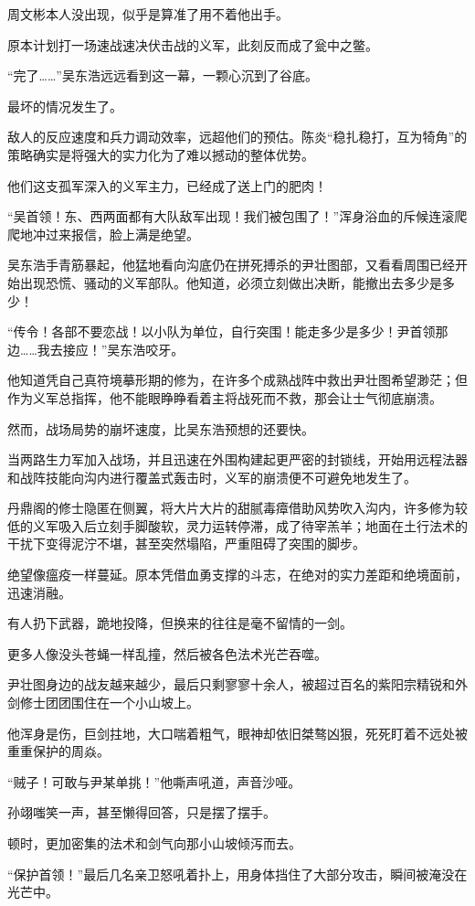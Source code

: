 周文彬本人没出现，似乎是算准了用不着他出手。

原本计划打一场速战速决伏击战的义军，此刻反而成了瓮中之鳖。

“完了……”吴东浩远远看到这一幕，一颗心沉到了谷底。

最坏的情况发生了。

敌人的反应速度和兵力调动效率，远超他们的预估。陈炎“稳扎稳打，互为犄角”的策略确实是将强大的实力化为了难以撼动的整体优势。

他们这支孤军深入的义军主力，已经成了送上门的肥肉！

“吴首领！东、西两面都有大队敌军出现！我们被包围了！”浑身浴血的斥候连滚爬爬地冲过来报信，脸上满是绝望。

吴东浩手青筋暴起，他猛地看向沟底仍在拼死搏杀的尹壮图部，又看看周围已经开始出现恐慌、骚动的义军部队。他知道，必须立刻做出决断，能撤出去多少是多少！

“传令！各部不要恋战！以小队为单位，自行突围！能走多少是多少！尹首领那边……我去接应！”吴东浩咬牙。

他知道凭自己真符境摹形期的修为，在许多个成熟战阵中救出尹壮图希望渺茫；但作为义军总指挥，他不能眼睁睁看着主将战死而不救，那会让士气彻底崩溃。

然而，战场局势的崩坏速度，比吴东浩预想的还要快。

当两路生力军加入战场，并且迅速在外围构建起更严密的封锁线，开始用远程法器和战阵技能向沟内进行覆盖式轰击时，义军的崩溃便不可避免地发生了。

丹鼎阁的修士隐匿在侧翼，将大片大片的甜腻毒瘴借助风势吹入沟内，许多修为较低的义军吸入后立刻手脚酸软，灵力运转停滞，成了待宰羔羊；地面在土行法术的干扰下变得泥泞不堪，甚至突然塌陷，严重阻碍了突围的脚步。

绝望像瘟疫一样蔓延。原本凭借血勇支撑的斗志，在绝对的实力差距和绝境面前，迅速消融。

有人扔下武器，跪地投降，但换来的往往是毫不留情的一剑。

更多人像没头苍蝇一样乱撞，然后被各色法术光芒吞噬。

尹壮图身边的战友越来越少，最后只剩寥寥十余人，被超过百名的紫阳宗精锐和外剑修士团团围住在一个小山坡上。

他浑身是伤，巨剑拄地，大口喘着粗气，眼神却依旧桀骜凶狠，死死盯着不远处被重重保护的周焱。

“贼子！可敢与尹某单挑！”他嘶声吼道，声音沙哑。

孙翊嗤笑一声，甚至懒得回答，只是摆了摆手。

顿时，更加密集的法术和剑气向那小山坡倾泻而去。

“保护首领！”最后几名亲卫怒吼着扑上，用身体挡住了大部分攻击，瞬间被淹没在光芒中。

